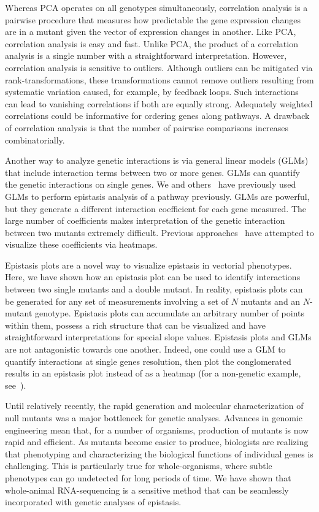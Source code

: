 \documentclass[9pt,twocolumn,twoside,lineno]{pnas-new}
\begin{document}
Whereas PCA operates on all genotypes simultaneously, correlation analysis is a
pairwise procedure that measures how predictable the gene expression changes are
in a mutant given the vector of expression changes in another. Like PCA,
correlation analysis is easy and fast. Unlike PCA, the product of a correlation
analysis is a single number with a straightforward interpretation. However,
correlation analysis is sensitive to outliers. Although outliers can be
mitigated via rank-transformations, these transformations cannot remove outliers
resulting from systematic variation caused, for example, by feedback loops. Such
interactions can lead to vanishing correlations if both are equally strong.
Adequately weighted correlations could be informative for ordering genes along
pathways. A drawback of correlation analysis is that the number of pairwise
comparisons increases combinatorially.

Another way to analyze genetic interactions is via general linear models (GLMs)
that include interaction terms between two or more genes. GLMs can quantify the
genetic interactions on single genes. We and others~\cite{Dixit2016,
Angeles-Albores2016a} have previously used GLMs to perform epistasis analysis of
a pathway previously. GLMs are powerful, but they generate a different
interaction coefficient for each gene measured. The large number of coefficients
makes interpretation of the genetic interaction between two mutants extremely
difficult. Previous approaches~\cite{Dixit2016} have attempted to visualize
these coefficients via heatmaps.

Epistasis plots are a novel way to visualize epistasis in vectorial phenotypes.
Here, we have shown how an epistasis plot can be used to identify interactions
between two single mutants and a double mutant. In reality, epistasis plots can
be generated for any set of measurements involving a set of $N$ mutants and an
$N$-mutant genotype. Epistasis plots can accumulate an arbitrary number of
points within them, possess a rich structure that can be visualized and have
straightforward interpretations for special slope values. Epistasis plots and
GLMs are not antagonistic towards one another. Indeed, one could use a GLM to
quantify interactions at single genes resolution, then plot the conglomerated
results in an epistasis plot instead of as a heatmap (for a non-genetic example,
see~\cite{Angeles-Albores2016a}).

Until relatively recently, the rapid generation and molecular characterization
of null mutants was a major bottleneck for genetic analyses. Advances in
genomic engineering mean that, for a number of organisms, production of mutants
is now rapid and efficient. As mutants become easier to produce, biologists are
realizing that phenotyping and characterizing the biological functions of
individual genes is challenging. This is particularly true for whole-organisms,
where subtle phenotypes can go undetected for long periods of time. We have
shown that whole-animal RNA-sequencing is a sensitive method that can be
seamlessly incorporated with genetic analyses of epistasis.
\end{document}
